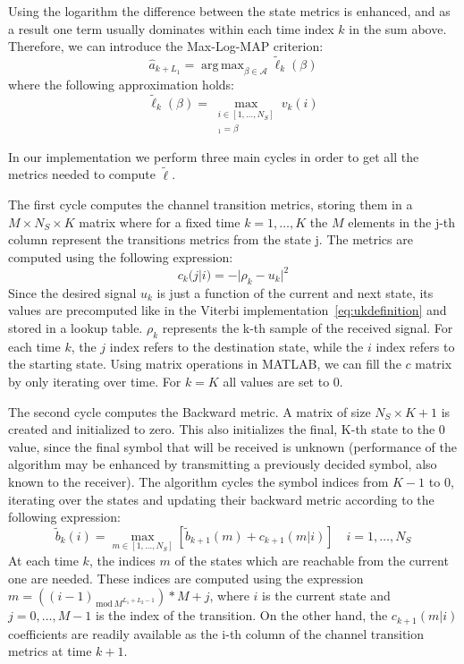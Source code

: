 \documentclass[10pt]{article}
\DeclareMathOperator*{\argmax}{arg\,max}
\newcommand{\lmod}[1] {_{\,\mathrm{mod}\,#1}}
\begin{document}
Using the logarithm the difference between the state metrics is enhanced, and as a result one term usually dominates within each time index $k$ in the sum above. Therefore, we can introduce the Max-Log-MAP criterion:
\begin{equation}
	\hat{a}_{k+L_1} = \argmax_{\beta \in \mathcal{A}} \tilde{\ell}_k(\beta)
	\label{eq:decision}
\end{equation}
where the following approximation holds:
\begin{equation}
	\tilde{\ell}_k(\beta) = \max_{\substack{i \in [1, \dots, N_S] \\ [\boldsymbol{\sigma}_i]_1 = \beta}} v_k(i)
	\label{eq:likelihood}
\end{equation}

In our implementation we perform three main cycles in order to get all the metrics needed to compute $\tilde{\ell}$. 

The first cycle computes the channel transition metrics, storing them in a $M \times N_S \times K$ matrix where for a fixed time $k = 1, \dots, K$ the $M$ elements in the j-th column represent the transitions metrics from the state j. The metrics are computed using the following expression: 
\begin{equation}
	c_k(j|i) = - |\rho_k - u_k|^2
\end{equation}
Since the desired signal $u_k$ is just a function of the current and next state, its values are precomputed like in the Viterbi implementation~\eqref{eq:ukdefinition} and stored in a lookup table. $\rho_k$ represents the k-th sample of the received signal. For each time $k$, the $j$ index refers to the destination state, while the $i$ index refers to the starting state. Using matrix operations in MATLAB, we can fill the $c$ matrix by only iterating over time. For $k = K$ all values are set to 0.

The second cycle computes the Backward metric. A matrix of size $N_S \times K+1$ is created and initialized to zero. This also initializes the final, K-th state to the 0 value, since the final symbol that will be received is unknown (performance of the algorithm may be enhanced by transmitting a previously decided symbol, also known to the receiver). The algorithm cycles the symbol indices from $K-1$ to $0$, iterating over the states and updating their backward metric according to the following expression:
\begin{equation}
	\tilde{b}_k(i) = \max_{m \in [1, \dots, N_S]}[\tilde{b}_{k+1}(m) + c_{k+1}(m|i)] \quad i = 1, \dots, N_S
\end{equation}
At each time $k$, the indices $m$ of the states which are reachable from the current one are needed. These indices are computed using the expression $m = ((i-1) \lmod{M^{L_1+L_2-1}}) * M + j$, where $i$ is the current state and $j = 0, \dots, M-1$ is the index of the transition. On the other hand, the $c_{k+1}(m|i)$ coefficients are readily available as the i-th column of the channel transition metrics at time $k+1$.
\end{document}
